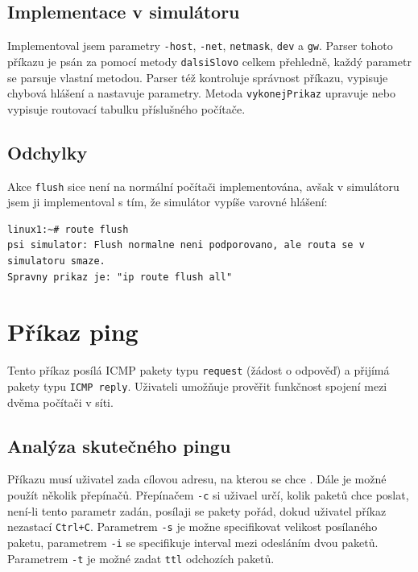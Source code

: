 \subsection{Implementace v simulátoru}

Implementoval jsem parametry \verb|-host|, \verb|-net|, \verb|netmask|, \verb|dev| a \verb|gw|. Parser tohoto příkazu je psán za pomocí metody \verb|dalsiSlovo| celkem přehledně, každý parametr se parsuje vlastní metodou. Parser též kontroluje správnost příkazu, vypisuje chybová hlášení a nastavuje parametry. Metoda \verb|vykonejPrikaz| upravuje nebo vypisuje routovací tabulku příslušného počítače.


\subsection{Odchylky}

Akce \verb|flush| sice není na normální počítači implementována, avšak v simulátoru jsem ji implementoval s tím, že simulátor vypíše varovné hlášení:
\begin{verbatim}
linux1:~# route flush
psi simulator: Flush normalne neni podporovano, ale routa se v simulatoru smaze.
Spravny prikaz je: "ip route flush all"
\end{verbatim}




\section{Příkaz ping}

Tento příkaz posílá ICMP pakety typu \verb|request| (žádost o odpověď) a přijímá pakety typu \verb|ICMP reply|. Uživateli umožňuje prověřit funkčnost spojení mezi dvěma počítači v síti.


\subsection{Analýza skutečného pingu}

Příkazu musí uživatel zada cílovou adresu, na kterou se chce . Dále je možné použít několik přepínačů. Přepínačem \verb|-c| si uživael určí, kolik paketů chce poslat, není-li tento parametr zadán, posílaji se pakety pořád, dokud uživatel příkaz nezastací \verb|Ctrl+C|. Parametrem \verb|-s| je možne specifikovat velikost posílaného paketu, parametrem \verb|-i| se specifikuje interval mezi odesláním dvou paketů. Parametrem \verb|-t| je možné zadat \verb|ttl| odchozích paketů.


